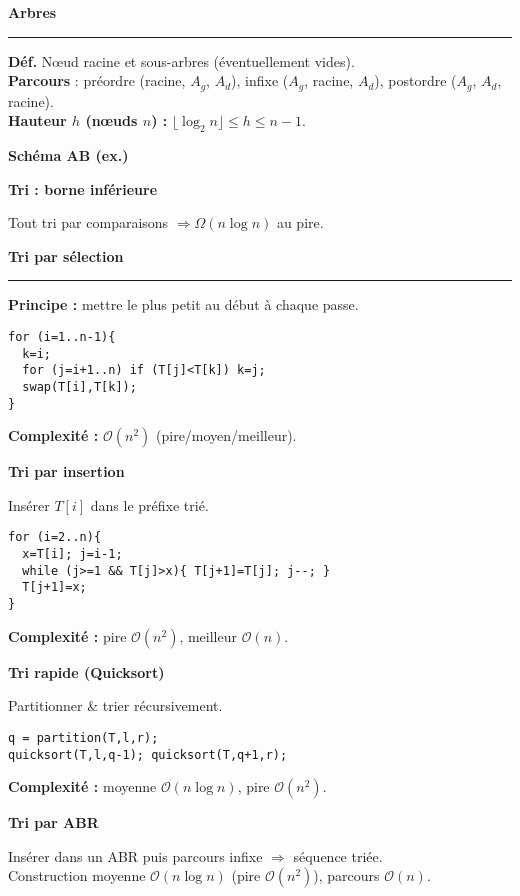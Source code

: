 \documentclass[9pt,a4paper]{article}
\newcommand{\bigO}{\mathcal{O}}
\newcommand{\sect}[1]{\vspace{1ex}\textbf{\large #1}\par\vspace{0.3ex}\hrule\vspace{0.6ex}}
\newcommand{\subsect}[1]{\vspace{0.4ex}\textbf{#1}\par}
\begin{document}
\begin{multicols}{3}
    \sect{Arbres}
    \textbf{Déf.} Nœud racine et sous-arbres (éventuellement vides).\\
    \textbf{Parcours} :
    préordre (racine, $A_g$, $A_d$),
    infixe ($A_g$, racine, $A_d$),
    postordre ($A_g$, $A_d$, racine).\\
    \textbf{Hauteur $h$ (nœuds $n$) :} $\lfloor\log_2 n\rfloor \le h \le n-1$.

    \subsect{Schéma AB (ex.)}
    \begin{center}
    \end{center}

    \subsect{Tri : borne inférieure}
    Tout tri par comparaisons $\Rightarrow \Omega(n\log n)$ au pire.

    \sect{Tri par sélection}
    \textbf{Principe :} mettre le plus petit au début à chaque passe.
    \begin{lstlisting}[style=tight]
for (i=1..n-1){
  k=i;
  for (j=i+1..n) if (T[j]<T[k]) k=j;
  swap(T[i],T[k]);
}
\end{lstlisting}
    \textbf{Complexité :} $\bigO(n^2)$ (pire/moyen/meilleur).

    \subsect{Tri par insertion}
    Insérer $T[i]$ dans le préfixe trié.
    \begin{lstlisting}[style=tight]
for (i=2..n){
  x=T[i]; j=i-1;
  while (j>=1 && T[j]>x){ T[j+1]=T[j]; j--; }
  T[j+1]=x;
}
\end{lstlisting}
    \textbf{Complexité :} pire $\bigO(n^2)$, meilleur $\bigO(n)$.

    \subsect{Tri rapide (Quicksort)}
    Partitionner \& trier récursivement.
    \begin{lstlisting}[style=tight]
q = partition(T,l,r);
quicksort(T,l,q-1); quicksort(T,q+1,r);
\end{lstlisting}
    \textbf{Complexité :} moyenne $\bigO(n\log n)$, pire $\bigO(n^2)$.

    \subsect{Tri par ABR}
    Insérer dans un ABR puis parcours infixe $\Rightarrow$ séquence triée.\\
    Construction moyenne $\bigO(n\log n)$ (pire $\bigO(n^2)$), parcours $\bigO(n)$.


\end{multicols}
\end{document}
